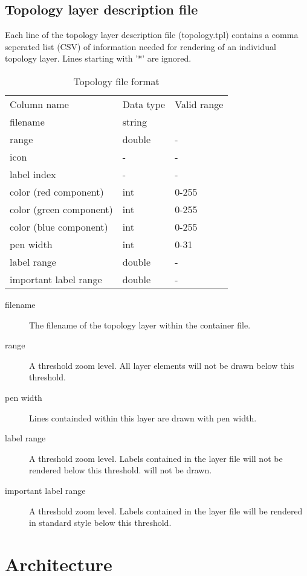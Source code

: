 \documentclass[a4paper,12pt]{refrep}
\begin{document}
\section{Topology layer description file}
Each line of the topology layer description file (topology.tpl) contains
a comma seperated list (CSV) of information needed for rendering of an
individual topology layer. Lines starting with '*' are ignored.
\begin{table}[ht]
\centering
\sffamily
\begin{tabular}{@{}lll@{}}
\toprule
\addlinespace
Column name&Data type&Valid range\\
\cmidrule(r){1-1}\cmidrule(lr){2-2}\cmidrule(l){3-3}
filename&string&\\
range&double&-\\
icon&-&-\\
label index&-&-\\
color (red component)&int&0-255\\
color (green component)&int&0-255\\
color (blue component)&int&0-255\\
pen width&int&0-31\\
label range&double&-\\
important label range&double&-\\
\bottomrule
\end{tabular}
\caption{Topology file format}
\label{tab:topology-file-format}
\end{table}

\begin{description}
\item[filename] The filename of the topology layer within the container file.
\item[range] A threshold zoom level. All layer elements will not be drawn
below this threshold.
\item[pen width] Lines containded within this layer are drawn with pen width.
\item[label range] A threshold zoom level. Labels contained in the layer file
will not be rendered below this threshold.
will not be drawn.
\item[important label range] A threshold zoom level. Labels contained
in the layer file will be rendered in standard style below this threshold.
\end{description}

\chapter{Architecture}
\end{document}
